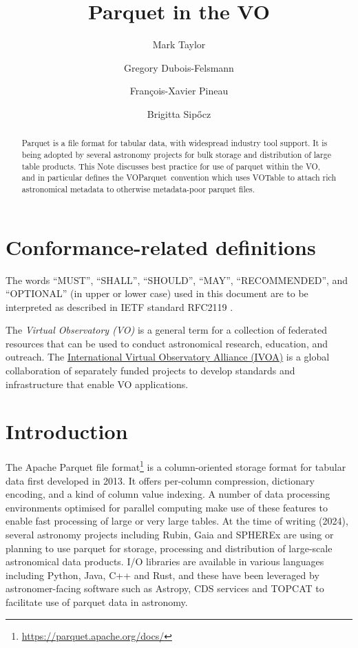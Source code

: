 \documentclass[11pt,a4paper]{ivoa}
\title{Parquet in the VO}
\author[https://wiki.ivoa.net/twiki/bin/view/IVOA/MarkTaylor]
       {Mark Taylor}
\author[https://wiki.ivoa.net/twiki/bin/view/IVOA/GregoryDuboisFelsmann]
       {Gregory Dubois-Felsmann}
\author[https://wiki.ivoa.net/twiki/bin/view/IVOA/FrancoisXavierPineau]
       {Fran\c{c}ois-Xavier Pineau}
\author{Brigitta Sip\H{o}cz}
\newcommand{\voparquet}{VOParquet}
\begin{document}
\begin{abstract}
Parquet is a file format for tabular data,
with widespread industry tool support.
It is being adopted by several astronomy projects for bulk storage and
distribution of large table products.
This Note discusses best practice for use of parquet within the VO,
and in particular defines the \voparquet\ convention
which uses VOTable to attach rich astronomical metadata
to otherwise metadata-poor parquet files.
\end{abstract}

\section*{Conformance-related definitions}

The words ``MUST'', ``SHALL'', ``SHOULD'', ``MAY'', ``RECOMMENDED'', and
``OPTIONAL'' (in upper or lower case) used in this document are to be
interpreted as described in IETF standard RFC2119 \citep{std:RFC2119}.

The \emph{Virtual Observatory (VO)} is a
general term for a collection of federated resources that can be used
to conduct astronomical research, education, and outreach.
The \href{https://www.ivoa.net}{International
Virtual Observatory Alliance (IVOA)} is a global
collaboration of separately funded projects to develop standards and
infrastructure that enable VO applications.


\section{Introduction}
\label{sec:intro}

The Apache Parquet file
format\footnote{\url{https://parquet.apache.org/docs/}}
is a column-oriented storage format for tabular data
first developed in 2013.
It offers per-column compression, dictionary encoding, and
a kind of column value indexing.
A number of data processing environments optimised for parallel
computing make use of these features to enable fast processing
of large or very large tables.
At the time of writing (2024),
several astronomy projects including Rubin, Gaia and SPHEREx
are using or planning to use parquet for storage, processing
and distribution of large-scale astronomical data products.
I/O libraries are available in various languages including Python,
Java, C++ and Rust, and these have been leveraged by astronomer-facing
software such as Astropy, CDS services and TOPCAT to facilitate
use of parquet data in astronomy.
\end{document}
